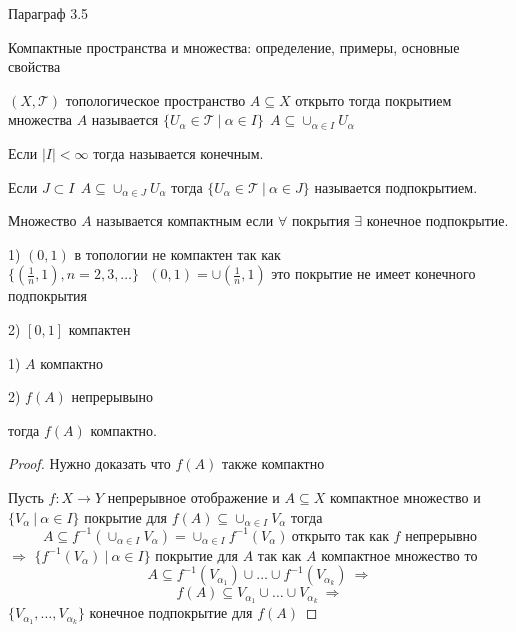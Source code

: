 \begin{title}[\Large]
  Параграф 3.5
\end{title}

\begin{title}[\Large]
  Компактные пространства и множества: определение, примеры, основные свойства
\end{title}

\begin{define}
  $(X, \mathcal{T})$ топологическое пространство $A \subseteq X$ открыто тогда
  покрытием множества $A$ называется $\{ U_{\alpha} \in \mathcal{T} ~ | ~
  \alpha \in I \} ~~ A \subseteq \cup_{\alpha \in I} U_{\alpha}$

  Если $|I| < \infty$ тогда называется конечным.

  Если $J \subset I ~~ A \subseteq \cup_{\alpha \in J} U_{\alpha}$ тогда
  $\{U_{\alpha} \in \mathcal{T} ~ | ~ \alpha \in J \}$ называется подпокрытием.
\end{define}

\begin{define}
  Множество $A$ называется компактным если $\forall$ покрытия $\exists$
  конечное подпокрытие.
\end{define}

\begin{block}[Примеры]
  1)  $(0,1)$ в топологии не компактен так как $\{(\frac{1}{n}, 1),
  n = 2,3, \ldots\} ~~~ (0,1) = \cup (\frac{1}{n}, 1)$ это покрытие не имеет
  конечного подпокрытия

  2) $[0,1]$ компактен
\end{block}

\begin{theorem}
  1) $A$ компактно

  2) $f(A)$ непрерывыно

  тогда $f(A)$ компактно.
\end{theorem}

\begin{proof}
  Нужно доказать что $f(A)$ также компактно

  Пусть $f: X \to Y$ непрерывное отображение и $A \subseteq X$ компактное
  множество и $\{ V_{\alpha} ~ | ~ \alpha \in I \}$ покрытие для $f(A) \subseteq
  \cup_{\alpha \in I} V_{\alpha}$ тогда
  $$
  A \subseteq f^{-1} (\cup_{\alpha \in I} V_{\alpha}) =
  \cup_{\alpha \in I} f^{-1}(V_{\alpha}) ~ \text{открыто так как $f$ непрерывно}
  $$
  $\Rightarrow$ $\{f^{-1}(V_{\alpha}) ~ | ~ \alpha \in I\}$ покрытие для $A$
  так как $A$ компактное множество то
  $$
  A \subseteq f^{-1} (V_{\alpha_1}) \cup \ldots \cup f^{-1} (V_{\alpha_k})
  ~ \Rightarrow
  $$
  $$
  f(A) \subseteq V_{\alpha_1} \cup \ldots \cup V_{\alpha_k} ~ \Rightarrow
  $$
  $\{V_{\alpha_1}, \ldots, V_{\alpha_k}\}$ конечное подпокрытие для $f(A)$
\end{proof}

